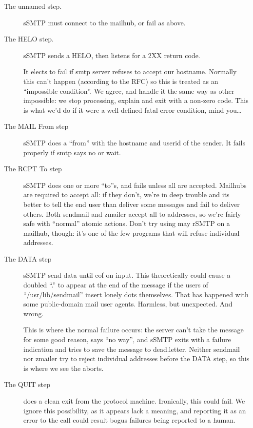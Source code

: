 \begin{description}
\item[The unnamed step.] 
	sSMTP must connect to the mailhub, or fail as above.
\item[The HELO step.]
	sSMTP sends a HELO, then listens for a 2XX return code.
	
	It elects to fail if smtp server refuses to accept our hostname.
	Normally this can't happen (according to the RFC) so this is 
	treated as an ``impossible condition''.  We agree, and handle it 
	the same way as other impossible: we stop processing, explain and
	exit with a non-zero code.  This is what we'd do if it were a 
	well-defined fatal error condition, mind you\ldots

\item[The MAIL From step] 
	sSMTP does a ``from'' with the hostname and userid of the sender.
	It fails properly if smtp says no or wait.

\item[The RCPT To step]
	sSMTP does one or more ``to''s, and fails unless all are accepted. 
	Mailhubs are required to accept all: if they don't, we're in deep
	trouble and its better to tell the end user than deliver some 
	messages and fail to deliver others.
	Both sendmail and zmailer accept all to addresses, so we're fairly
	safe with ``normal'' atomic actions. Don't try using may rSMTP on
	a mailhub, though: it's one of the few programs that will refuse
	individual addresses.

\item[The DATA step]
	sSMTP send data until eof on input.  This theoretically could
	cause a doubled ``.'' to appear at the end of the message if the
	users of ``/usr/lib/sendmail'' insert lonely dots themselves.  That
	has happened with some public-domain mail user agents. 	Harmless, but 
	unexpected.  And wrong.

	This is where the normal failure occurs: the server can't
	take the message for some good reason, says ``no way'', and
	sSMTP exits with a failure indication and tries to save the
	message to dead.letter.  Neither sendmail nor zmailer
	try to reject individual addresses before the DATA step, so
	this is where we see the aborts.

\item[The QUIT step] does a clean exit from the protocol machine.
	Ironically, this could fail. We ignore this possibility,
	as it appears lack a meaning, and reporting it as an error
	to the call could result bogus failures being reported to
	a human.

\end{description}

